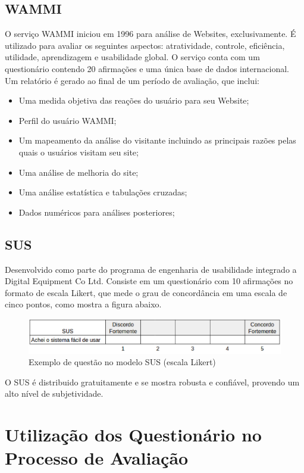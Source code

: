 \subsection{WAMMI}
O serviço WAMMI iniciou em 1996 para análise de Websites, exclusivamente. É utilizado para avaliar os seguintes aspectos: atratividade, controle, eficiência, utilidade, aprendizagem e usabilidade global. O serviço conta com um questionário contendo 20 afirmações e uma única base de dados internacional. Um relatório é gerado ao final de um período de avaliação, que inclui:
\begin{itemize}
	\item Uma medida objetiva das reações do usuário para seu Website;
	\item Perfil do usuário WAMMI;
	\item Um mapeamento da análise do visitante incluindo as principais razões pelas quais o usuários visitam seu site;
	\item Uma análise de melhoria do site;
	\item Uma análise estatística e tabulações cruzadas;
	\item Dados numéricos para análises posteriores;
\end{itemize}

\subsection{SUS}
Desenvolvido como parte do programa de engenharia de usabilidade integrado a Digital Equipment Co Ltd. Consiste em um questionário com 10 afirmações no formato de escala Likert, que mede o grau de concordância em uma escala de cinco pontos, como mostra a figura abaixo.

\begin{figure}[h]
	\centering
	\includegraphics[scale=0.5]{figuras/sus.eps}
	\caption{Exemplo de questão no modelo SUS (escala Likert)}
\end{figure}

O SUS é distribuido gratuitamente e se mostra robusta e confiável, provendo um alto nível de subjetividade.

\nocite{FILARDI_TRAINA_2008}

\section{Utilização dos Questionário no Processo de Avaliação}

